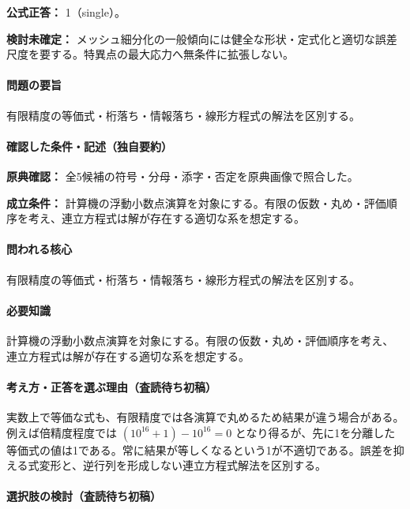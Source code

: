 \textbf{公式正答：} 1（single）。

\par\textbf{検討未確定：} メッシュ細分化の一般傾向には健全な形状・定式化と適切な誤差尺度を要する。特異点の最大応力へ無条件に拡張しない。

\paragraph{問題の要旨} 有限精度の等価式・桁落ち・情報落ち・線形方程式の解法を区別する。

\paragraph{確認した条件・記述（独自要約）}\mbox{}\par

\noindent\textbf{原典確認：} 全5候補の符号・分母・添字・否定を原典画像で照合した。\par

\noindent\textbf{成立条件：} 計算機の浮動小数点演算を対象にする。有限の仮数・丸め・評価順序を考え、連立方程式は解が存在する適切な系を想定する。\par

\paragraph{問われる核心} 有限精度の等価式・桁落ち・情報落ち・線形方程式の解法を区別する。

\paragraph{必要知識} 計算機の浮動小数点演算を対象にする。有限の仮数・丸め・評価順序を考え、連立方程式は解が存在する適切な系を想定する。

\paragraph{考え方・正答を選ぶ理由（査読待ち初稿）} 実数上で等価な式も、有限精度では各演算で丸めるため結果が違う場合がある。例えば倍精度程度では \((10^{16}+1)-10^{16}=0\) となり得るが、先に1を分離した等価式の値は1である。常に結果が等しくなるという1が不適切である。誤差を抑える式変形と、逆行列を形成しない連立方程式解法を区別する。

\paragraph{選択肢の検討（査読待ち初稿）}\mbox{}\par

